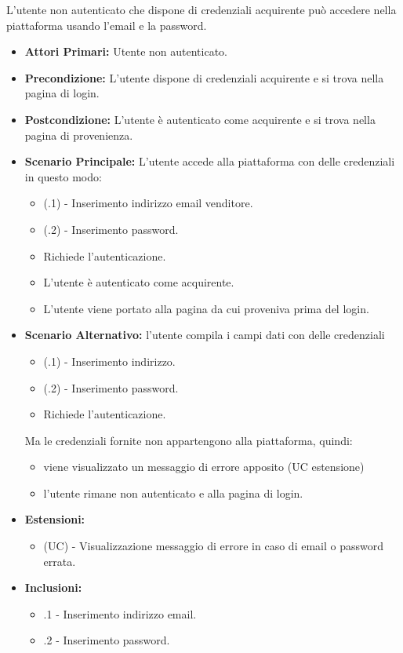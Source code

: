 L'utente non autenticato che dispone di credenziali acquirente può accedere nella piattaforma usando l'email e la password.
\begin{itemize}
	\item \textbf{Attori Primari:} Utente non autenticato.
	\item \textbf{Precondizione:} L'utente dispone di credenziali acquirente e si trova nella pagina di login.
	\item \textbf{Postcondizione:} L'utente è autenticato come acquirente e si trova nella pagina di provenienza.
	\item \textbf{Scenario Principale:} L'utente accede alla piattaforma con delle credenziali in questo modo:
	\begin{itemize}
		\item (\actualUC.1) - Inserimento indirizzo email venditore.
		\item (\actualUC.2) - Inserimento password.
		\item Richiede l'autenticazione.
		\item L'utente è autenticato come acquirente.
		\item L'utente viene portato alla pagina da cui proveniva prima del login.
	\end{itemize}
	\item \textbf{Scenario Alternativo:} l'utente compila i campi dati con delle credenziali 
	\begin{itemize}
		\item (\actualUC.1) - Inserimento indirizzo.
		\item (\actualUC.2) - Inserimento password.
		\item Richiede l'autenticazione.
	\end{itemize}
	Ma le credenziali fornite non appartengono alla piattaforma, quindi:
	\begin{itemize}
		\item viene visualizzato un messaggio di errore apposito (UC estensione)
		\item l'utente rimane non autenticato e alla pagina di login.
	\end{itemize}
	\item \textbf{Estensioni:}
	\begin{itemize}
		\item (UC) - Visualizzazione messaggio di errore in caso di email o password errata.
	\end{itemize}
	\item \textbf{Inclusioni:}
	\begin{itemize}
		\item \actualUC.1 - Inserimento indirizzo email.
		\item \actualUC.2 - Inserimento  password. 
		\end{itemize}
\end{itemize}

